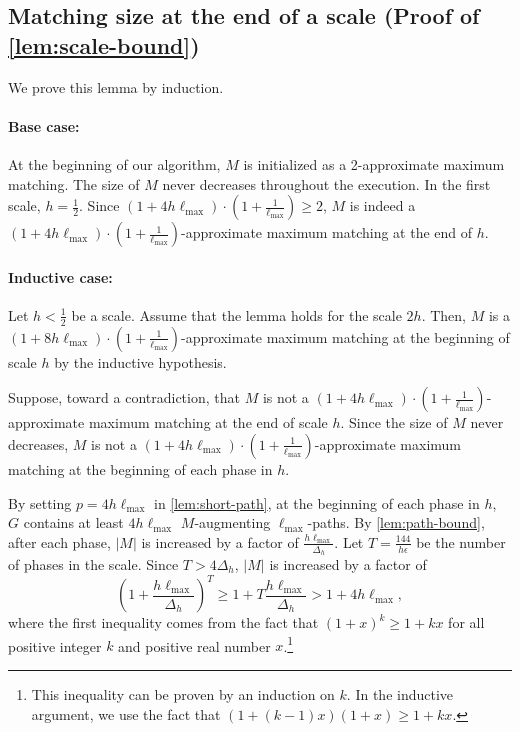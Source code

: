 \documentclass{article}
\newcommand{\eps}{\epsilon}
\newcommand{\lmax}{\ell_{\max}}
\newcommand{\rb}[1]{\left( #1 \right)}
\begin{document}
\subsection{Matching size at the end of a scale (Proof of \cref{lem:scale-bound})}
\label{sec:proof-scale-bound}
We prove this lemma by induction.

\paragraph{Base case:} 
At the beginning of our algorithm, $M$ is initialized as a 2-approximate maximum matching. The size of $M$ never decreases throughout the execution. In the first scale, $h = \frac{1}{2}$. 
Since $\rb{1 + 4h\lmax} \cdot \rb{1 + \frac{1}{\lmax}} \geq 2$, $M$ is indeed a $\rb{1 + 4h\lmax} \cdot \rb{1 + \frac{1}{\lmax}}$-approximate maximum matching at the end of $h$.
    


\paragraph{Inductive case:}    
    Let $h < \frac{1}{2}$ be a scale.
    Assume that the lemma holds for the scale $2h$.
    Then, $M$ is a $(1 + 8h\lmax) \cdot \rb{1 + \frac{1}{\lmax}}$-approximate maximum matching at the beginning of scale $h$ by the inductive hypothesis.
    
    Suppose, toward a contradiction, that $M$ is not a $\rb{1 + 4h\lmax} \cdot \rb{1 + \frac{1}{\lmax}}$-approximate maximum matching at the end of scale $h$.
    Since the size of $M$ never decreases, $M$ is not a $\rb{1 + 4h\lmax} \cdot \rb{1 + \frac{1}{\lmax}}$-approximate maximum matching at the beginning of each phase in $h$.
    
    By setting $p = 4h\lmax$ in \cref{lem:short-path}, at the beginning of each phase in $h$, $G$ contains at least $4h\lmax$ $M$-augmenting $\lmax$-paths.
    By \cref{lem:path-bound}, after each phase, $|M|$ is increased by a factor of $\frac{h\lmax}{\Delta_h}$.
    Let $T = \frac{144}{h \eps}$ be the number of phases in the scale.
    Since $T > 4\Delta_h$, $|M|$ is increased by a factor of
    \[
        \rb{1 + \frac{h\lmax}{\Delta_h}}^T
        \geq 1 + T \frac{h\lmax}{\Delta_h}
        > 1 + 4h\lmax,
    \]
    where the first inequality comes from the fact that $(1 + x)^k \geq 1 + kx$ for all positive integer $k$ and positive real number $x$.\footnote{This inequality can be proven by an induction on $k$. In the inductive argument, we use the fact that $(1 + (k-1)x)(1+x) \geq 1 + kx$.}
    
\end{document}

